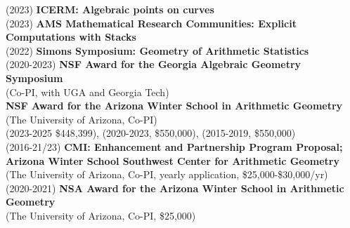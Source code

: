 \documentclass[margin,line]{res}
\begin{document}
\begin{resume}
(2023) \textbf{ICERM: Algebraic points on curves}\vspace{.15cm}\\
(2023) \textbf{AMS Mathematical Research Communities: Explicit Computations with Stacks}\vspace{.15cm}\\
(2022) \textbf{Simons Symposium: Geometry of Arithmetic Statistics}  \vspace{.15cm}\\
(2020-2023)  \textbf{NSF Award for the Georgia Algebraic Geometry Symposium}\\
  \vspace{5pt} (Co-PI, with UGA and Georgia Tech) \vspace{.05cm}\\
\textbf{NSF Award for the Arizona Winter School in Arithmetic Geometry}\\
    \vspace{1pt}   (The University of Arizona, Co-PI) \\
    \vspace{5pt}   (2023-2025 \$448,399), (2020-2023, \$550,000), (2015-2019, \$550,000) \vspace{.05cm}\\
(2016-21/23) \textbf{CMI: Enhancement and Partnership Program Proposal; Arizona Winter School Southwest Center for Arithmetic Geometry}\\
    \vspace{5pt} (The University of Arizona, Co-PI, yearly application, \$25,000-\$30,000/yr) \vspace{.05cm}\\
(2020-2021)  \textbf{NSA Award for the Arizona Winter School in Arithmetic Geometry}\\
    \vspace{5pt} (The University of Arizona, Co-PI, \$25,000) \vspace{.05cm}\\


\end{resume}
\end{document}
